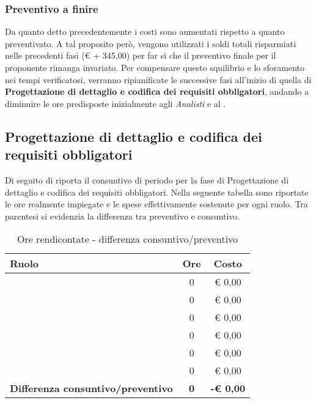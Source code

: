 
		\subsubsection{Preventivo a finire} %
		Da quanto detto precedentemente i costi sono aumentati rispetto a quanto preventivato. A tal proposito però, vengono utilizzati i soldi totali risparmiati nelle precedenti fasi (\euro{} + 345,00) per far si che il preventivo finale per il proponente rimanga invariato. \newline
		Per compensare questo squilibrio e lo sforamento nei tempi verificatosi, verranno ripianificate le successive fasi all'inizio di quella di \textbf{Progettazione di dettaglio e codifica dei requisiti obbligatori}, andando a diminuire le ore predisposte inizialmente agli \emph{Analisti} e al \roleProjectManager.



	\subsection{Progettazione di dettaglio e codifica dei requisiti obbligatori} %
	\label{sub:consuntivo_progettazione_di_dettaglio_e_codifica_dei_requisiti_obbligatori}
		Di seguito di riporta il consuntivo di periodo per la fase di Progettazione di dettaglio e codifica dei requisiti obbligatori. \newline
		Nella seguente tabella sono riportate le ore realmente impiegate e le spese effettivamente sostenute per ogni ruolo. Tra parentesi si evidenzia la differenza tra preventivo e consuntivo.
		\begin{table}[!h]
			\begin{center}
				\begin{tabularx}{0.90\textwidth}{|X|c|c|}
					\hline
					\textbf{Ruolo} & \textbf{Ore} & \textbf{Costo} \\
					\hline
					\roleProjectManager & 0 & \euro{} 0,00 \\
					\hline
					\roleAnalyst & 0 &  \euro{} 0,00 \\
					\hline
					\roleDesigner & 0 & \euro{} 0,00 \\
					\hline
					\roleAdministrator & 0  & \euro{} 0,00 \\
					\hline
					\roleProgrammer & 0 & \euro{} 0,00 \\
					\hline
					\roleVerifier & 0 & \euro{} 0,00 \\
					\hline
					\textbf{Differenza consuntivo/preventivo} & \textbf{0} & \textbf{-\euro{} 0,00} \\
					\hline
				\end{tabularx}
			\end{center}
		\caption{Ore rendicontate - differenza consuntivo/preventivo}
		\end{table}



